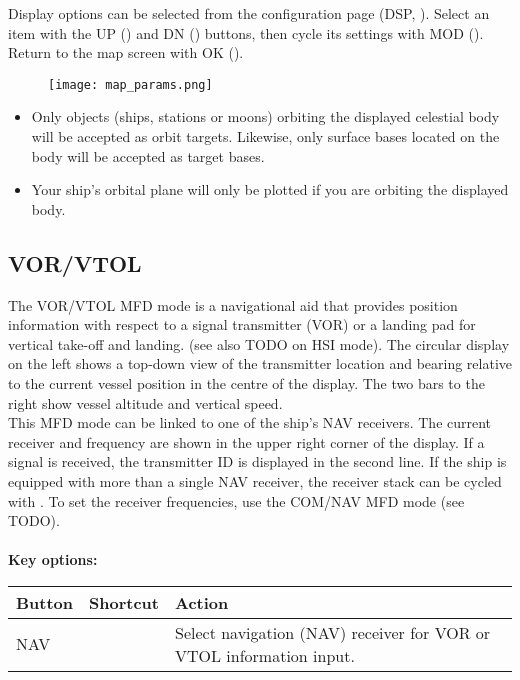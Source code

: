 \documentclass[Orbiter User Manual.tex]{subfiles}
\begin{document}
\noindent
Display options can be selected from the configuration page (DSP, \Shift{}). Select an item with the UP (\Shift\keystroke{-}) and DN (\Shift\keystroke{=}) buttons, then cycle its settings with MOD (\Shift{}). Return to the map screen with OK (\Shift{}).

\begin{figure}[H]
  \centering
  \texttt{[image: map\_params.png]}
\end{figure}

\begin{itemize}
\item Only objects (ships, stations or moons) orbiting the displayed celestial body will be accepted as orbit targets. Likewise, only surface bases located on the body will be accepted as target bases.
\item Your ship's orbital plane will only be plotted if you are orbiting the displayed body.
\end{itemize}


\subsection{VOR/VTOL}
The VOR/VTOL MFD mode is a navigational aid that provides position information with respect to a signal transmitter (VOR) or a landing pad for vertical take-off and landing. (see also TODO on HSI mode). The circular display on the left shows a top-down view of the transmitter location and bearing relative to the current vessel position in the centre of the display. The two bars to the right show vessel altitude and vertical speed.\\
This MFD mode can be linked to one of the ship's NAV receivers. The current receiver and frequency are shown in the upper right corner of the display. If a signal is received, the transmitter ID is displayed in the second line. If the ship is equipped with more than a single NAV receiver, the receiver stack can be cycled with \Shift{}. To set the receiver frequencies, use the COM/NAV MFD mode (see TODO).\\
\\
\textbf{Key options:}

	\begin{longtable}{ |p{}|p{}|p{}| }
	\hline\rule{0pt}{2ex}
	\textbf{Button} & \textbf{Shortcut} & \textbf{Action}\\
	\hline\rule{0pt}{2ex}
	NAV & \Shift\keystroke{N} & Select navigation (NAV) receiver for VOR or VTOL information input.\\
	\hline
	\end{longtable}
\end{document}
